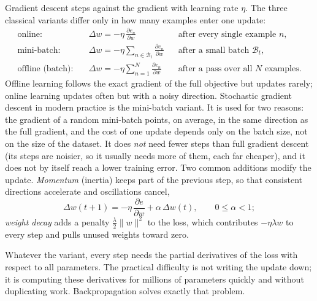 Gradient descent steps against the gradient with learning rate $\eta$. The
three classical variants differ only in how many examples enter one update:
\begin{align}
  \text{online:}\quad
    &\Delta w = -\eta\, \frac{\partial e_n}{\partial w}
      &&\text{after every single example } n,\\
  \text{mini-batch:}\quad
    &\Delta w = -\eta \sum_{n\in\mathcal{B}_t} \frac{\partial e_n}{\partial w}
      &&\text{after a small batch } \mathcal{B}_t,\\
  \text{offline (batch):}\quad
    &\Delta w = -\eta \sum_{n=1}^{N} \frac{\partial e_n}{\partial w}
      &&\text{after a pass over all } N \text{ examples}.
\end{align}
\noindent
Offline learning follows the exact gradient of the full objective but updates
rarely; online learning updates often but with a noisy direction. Stochastic
gradient descent in modern practice is the mini-batch variant. It is used for
two reasons: the gradient of a random mini-batch points, on average, in the
same direction as the full gradient, and the cost of one update depends only
on the batch size, not on the size of the dataset. It does \emph{not} need
fewer steps than full gradient descent (its steps are noisier, so it usually
needs more of them, each far cheaper), and it does not by itself reach a lower
training error. Two common
additions modify the update. \emph{Momentum} (inertia) keeps part of the previous
step, so that consistent directions accelerate and oscillations cancel,
\begin{equation}
  \Delta w(t+1) = -\eta\, \frac{\partial e}{\partial w} + \alpha\, \Delta w(t),
  \qquad 0 \le \alpha < 1 ;
\end{equation}
\noindent
\emph{weight decay} adds a penalty $\tfrac{\lambda}{2}\lVert w\rVert^2$ to the
loss, which contributes $-\eta\lambda w$ to every step and pulls unused weights
toward zero.

Whatever the variant, every step needs the partial derivatives of the loss with
respect to all parameters. The practical difficulty is not writing the update
down; it is computing these derivatives for millions of parameters quickly and
without duplicating work. Backpropagation solves exactly that problem.


